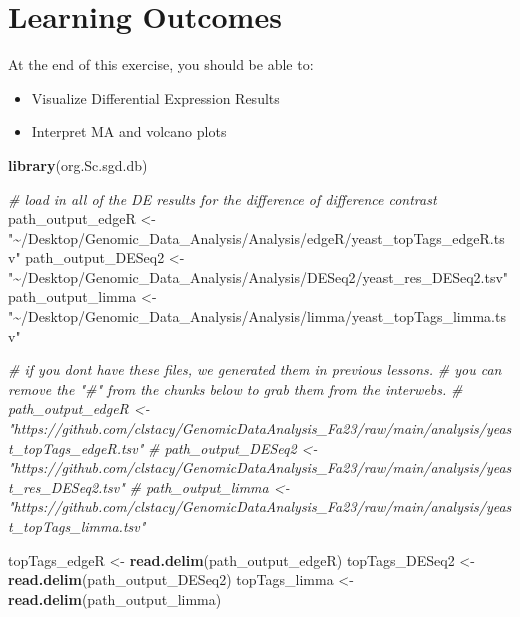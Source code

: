 \documentclass[
]{book}
\newenvironment{Shaded}{\begin{snugshade}}{\end{snugshade}}
\newcommand{\CommentTok}[1]{\textcolor[rgb]{0.56,0.35,0.01}{\textit{#1}}}
\newcommand{\FunctionTok}[1]{\textcolor[rgb]{0.13,0.29,0.53}{\textbf{#1}}}
\newcommand{\NormalTok}[1]{#1}
\newcommand{\OtherTok}[1]{\textcolor[rgb]{0.56,0.35,0.01}{#1}}
\newcommand{\StringTok}[1]{\textcolor[rgb]{0.31,0.60,0.02}{#1}}
\providecommand{\tightlist}{%
  \setlength{\itemsep}{0pt}\setlength{\parskip}{0pt}}
\begin{document}
\hypertarget{learning-outcomes-5}{%
\section{Learning Outcomes}\label{learning-outcomes-5}}

At the end of this exercise, you should be able to:

\begin{itemize}
\tightlist
\item
  Visualize Differential Expression Results
\item
  Interpret MA and volcano plots
\end{itemize}

\begin{Shaded}
\begin{Highlighting}[]
\FunctionTok{library}\NormalTok{(org.Sc.sgd.db)}
\end{Highlighting}
\end{Shaded}

\begin{Shaded}
\begin{Highlighting}[]
\CommentTok{\# load in all of the DE results for the difference of difference contrast}
\NormalTok{path\_output\_edgeR }\OtherTok{\textless{}{-}} \StringTok{"\textasciitilde{}/Desktop/Genomic\_Data\_Analysis/Analysis/edgeR/yeast\_topTags\_edgeR.tsv"}
\NormalTok{path\_output\_DESeq2 }\OtherTok{\textless{}{-}} \StringTok{"\textasciitilde{}/Desktop/Genomic\_Data\_Analysis/Analysis/DESeq2/yeast\_res\_DESeq2.tsv"}
\NormalTok{path\_output\_limma }\OtherTok{\textless{}{-}} \StringTok{"\textasciitilde{}/Desktop/Genomic\_Data\_Analysis/Analysis/limma/yeast\_topTags\_limma.tsv"}

\CommentTok{\# if you don\textquotesingle{}t have these files, we generated them in previous lessons.}
\CommentTok{\# you can remove the "\#" from the chunks below to grab them from the interwebs.}
\CommentTok{\# path\_output\_edgeR \textless{}{-} "https://github.com/clstacy/GenomicDataAnalysis\_Fa23/raw/main/analysis/yeast\_topTags\_edgeR.tsv"}
\CommentTok{\# path\_output\_DESeq2 \textless{}{-} "https://github.com/clstacy/GenomicDataAnalysis\_Fa23/raw/main/analysis/yeast\_res\_DESeq2.tsv"}
\CommentTok{\# path\_output\_limma \textless{}{-} "https://github.com/clstacy/GenomicDataAnalysis\_Fa23/raw/main/analysis/yeast\_topTags\_limma.tsv"}

\NormalTok{topTags\_edgeR }\OtherTok{\textless{}{-}} \FunctionTok{read.delim}\NormalTok{(path\_output\_edgeR)}
\NormalTok{topTags\_DESeq2 }\OtherTok{\textless{}{-}} \FunctionTok{read.delim}\NormalTok{(path\_output\_DESeq2)}
\NormalTok{topTags\_limma }\OtherTok{\textless{}{-}} \FunctionTok{read.delim}\NormalTok{(path\_output\_limma)}
\end{Highlighting}
\end{Shaded}
\end{document}
